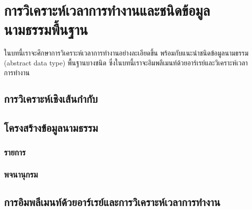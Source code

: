 \chapter{การ{\wbr}วิเคราะห์{\wbr}เวลา{\wbr}การ{\wbr}ทำงาน{\wbr}และ{\wbr}ชนิด{\wbr}ข้อมูล{\wbr}นามธรรม{\wbr}พื้นฐาน}
\label{chapter:analysis}

ใน{\wbr}บท{\wbr}นี้{\wbr}เรา{\wbr}จะ{\wbr}ศึกษา{\wbr}การ{\wbr}วิเคราะห์{\wbr}เวลา{\wbr}การ{\wbr}ทำงาน{\wbr}อย่าง{\wbr}ละเอียด{\wbr}ขึ้น{\wbr}
พร้อมกับ{\wbr}แนะนำ{\wbr}ชนิด{\wbr}ข้อมูล{\wbr}นามธรรม (abstract data type) พื้นฐาน{\wbr}บาง{\wbr}ชนิด{\wbr}
ซึ่ง{\wbr}ใน{\wbr}บท{\wbr}นี้{\wbr}เรา{\wbr}จะ{\wbr}อิม{\wbr}พลี{\wbr}เมนท์{\wbr}ด้วย{\wbr}อาร์เรย์{\wbr}และ{\wbr}วิเคราะห์{\wbr}เวลา{\wbr}การ{\wbr}ทำงาน{\wbr}

\section{การ{\wbr}วิเคราะห์{\wbr}เชิง{\wbr}เส้น{\wbr}กำกับ}

\section{โครงสร้าง{\wbr}ข้อมูล{\wbr}นามธรรม}

\subsection{รายการ}

\subsection{พจนานุกรม}

\section{การ{\wbr}อิม{\wbr}พลี{\wbr}เมนท์{\wbr}ด้วย{\wbr}อาร์เรย์{\wbr}และ{\wbr}การ{\wbr}วิเคราะห์{\wbr}เวลา{\wbr}การ{\wbr}ทำงาน}
